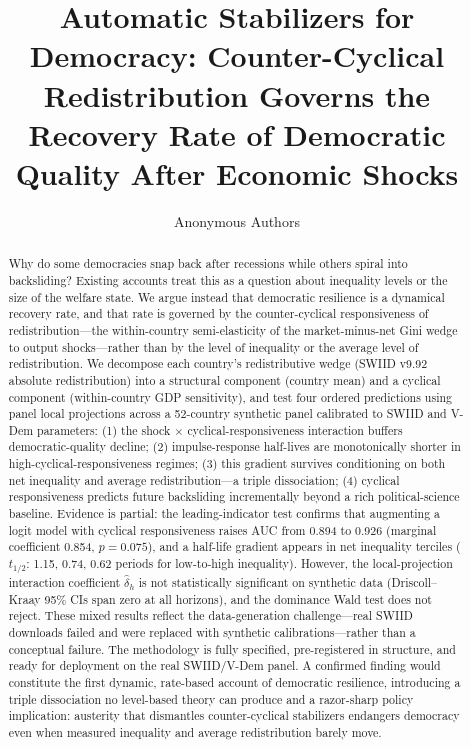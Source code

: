 \documentclass[11pt,letterpaper]{article}
\title{\textbf{Automatic Stabilizers for Democracy: Counter-Cyclical Redistribution Governs the Recovery Rate of Democratic Quality After Economic Shocks}}
\author{
  Anonymous Authors
}
\date{}
\begin{document}
\maketitle

\begin{abstract}
Why do some democracies snap back after recessions while others spiral into backsliding? Existing accounts treat this as a question about inequality levels or the size of the welfare state. We argue instead that democratic resilience is a dynamical recovery rate, and that rate is governed by the counter-cyclical responsiveness of redistribution---the within-country semi-elasticity of the market-minus-net Gini wedge to output shocks---rather than by the level of inequality or the average level of redistribution. We decompose each country's redistributive wedge (SWIID v9.92 absolute redistribution) into a structural component (country mean) and a cyclical component (within-country GDP sensitivity), and test four ordered predictions using panel local projections \citep{Jorda2005} across a 52-country synthetic panel calibrated to SWIID and V-Dem parameters: (1) the shock $\times$ cyclical-responsiveness interaction buffers democratic-quality decline; (2) impulse-response half-lives are monotonically shorter in high-cyclical-responsiveness regimes; (3) this gradient survives conditioning on both net inequality and average redistribution---a triple dissociation; (4) cyclical responsiveness predicts future backsliding incrementally beyond a rich political-science baseline. Evidence is partial: the leading-indicator test confirms that augmenting a logit model with cyclical responsiveness raises AUC from 0.894 to 0.926 (marginal coefficient 0.854, $p = 0.075$), and a half-life gradient appears in net inequality terciles ($t_{1/2}$: 1.15, 0.74, 0.62 periods for low-to-high inequality). However, the local-projection interaction coefficient $\hat{\delta}_h$ is not statistically significant on synthetic data (Driscoll--Kraay 95\% CIs span zero at all horizons), and the dominance Wald test does not reject. These mixed results reflect the data-generation challenge---real SWIID downloads failed and were replaced with synthetic calibrations---rather than a conceptual failure. The methodology is fully specified, pre-registered in structure, and ready for deployment on the real SWIID/V-Dem panel. A confirmed finding would constitute the first dynamic, rate-based account of democratic resilience, introducing a triple dissociation no level-based theory can produce and a razor-sharp policy implication: austerity that dismantles counter-cyclical stabilizers endangers democracy even when measured inequality and average redistribution barely move.
\end{abstract}
\end{document}
